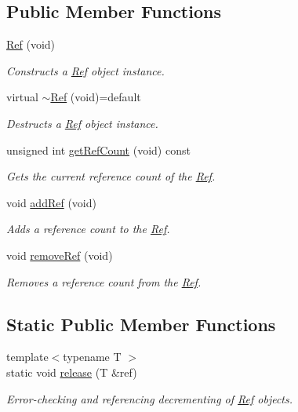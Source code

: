 \subsection*{Public Member Functions}
\begin{DoxyCompactItemize}
\item 
\hyperlink{classsparky_1_1_ref_a0947962689474dc06248f52e62022729}{Ref} (void)
\begin{DoxyCompactList}\small\item\em Constructs a \hyperlink{classsparky_1_1_ref}{Ref} object instance. \end{DoxyCompactList}\item 
virtual \hyperlink{classsparky_1_1_ref_ac1f745dbc70be6aa1550d08bb5d74d27}{$\sim$\+Ref} (void)=default
\begin{DoxyCompactList}\small\item\em Destructs a \hyperlink{classsparky_1_1_ref}{Ref} object instance. \end{DoxyCompactList}\item 
unsigned int \hyperlink{classsparky_1_1_ref_a25f72de3eab90cc4cd17d90a2762ceb8}{get\+Ref\+Count} (void) const 
\begin{DoxyCompactList}\small\item\em Gets the current reference count of the \hyperlink{classsparky_1_1_ref}{Ref}. \end{DoxyCompactList}\item 
void \hyperlink{classsparky_1_1_ref_aeeb606836c315aa3b8a2254e23eb0899}{add\+Ref} (void)
\begin{DoxyCompactList}\small\item\em Adds a reference count to the \hyperlink{classsparky_1_1_ref}{Ref}. \end{DoxyCompactList}\item 
void \hyperlink{classsparky_1_1_ref_acb1878708d20ec8051a8182a83c4a370}{remove\+Ref} (void)
\begin{DoxyCompactList}\small\item\em Removes a reference count from the \hyperlink{classsparky_1_1_ref}{Ref}. \end{DoxyCompactList}\end{DoxyCompactItemize}
\subsection*{Static Public Member Functions}
\begin{DoxyCompactItemize}
\item 
{\footnotesize template$<$typename T $>$ }\\static void \hyperlink{classsparky_1_1_ref_a3234294a7cd7ca2c0da66c76234f4b59}{release} (T \&ref)
\begin{DoxyCompactList}\small\item\em Error-\/checking and referencing decrementing of \hyperlink{classsparky_1_1_ref}{Ref} objects. \end{DoxyCompactList}\end{DoxyCompactItemize}


